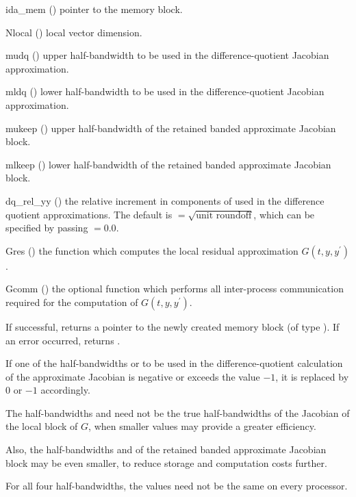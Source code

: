 {
  \begin{args}[dq\_rel\_yy]
  \item[ida\_mem] ()
    pointer to the {\ida} memory block.
  \item[Nlocal] ()
    local vector dimension.
  \item[mudq] ()
    upper half-bandwidth to be used in the difference-quotient Jacobian approximation.
  \item[mldq] ()
    lower half-bandwidth to be used in the difference-quotient Jacobian approximation.
  \item[mukeep] ()
    upper half-bandwidth of the retained banded approximate Jacobian block.
  \item[mlkeep] ()
    lower half-bandwidth of the retained banded approximate Jacobian block.
  \item[dq\_rel\_yy] ()
    the relative increment in components of  used in the difference quotient
    approximations.  The default 
    is $ = \sqrt{\text{unit roundoff}}$, which
    can be specified by passing $ = 0.0$.
  \item[Gres] ()
    the {\C} function which computes the local residual approximation 
    $G(t,y,y^\prime)$.
  \item[Gcomm] ()
    the optional {\C} function which performs all inter-process communication required
    for the computation of $G(t,y,y^\prime)$.
  \end{args}
}
{
  If successful,  returns a pointer to the newly created 
  {\idabbdpre} memory block (of type ).
  If an error occurred,  returns .
}
{
  If one of the half-bandwidths  or  to be used in the 
  difference-quotient calculation of the approximate Jacobian is negative or 
  exceeds the value $-1$, it is replaced by 0 or $-1$
  accordingly.

  The half-bandwidths  and  need not be the true 
  half-bandwidths of the Jacobian of the local block of $G$,    
  when smaller values may provide a greater efficiency.       

  Also, the half-bandwidths  and  of the retained 
  banded approximate Jacobian block may be even smaller,      
  to reduce storage and computation costs further.            

  For all four half-bandwidths, the values need not be the    
  same on every processor.
}
